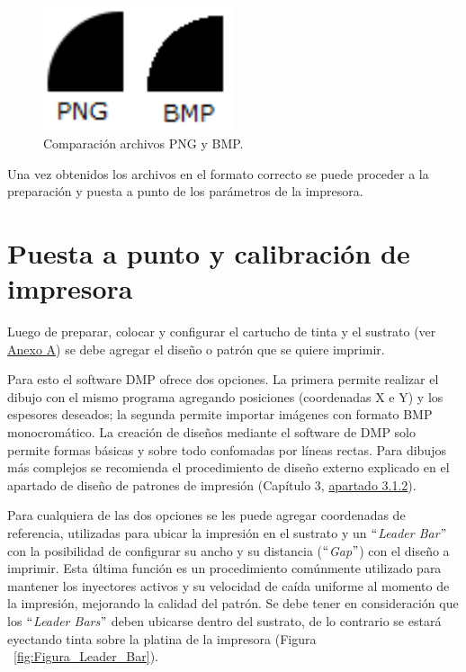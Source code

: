 \begin{figure}[H]
  \centering
    \includegraphics[width=0.5\textwidth]{Figuras/Figura_comparacion_png_bmp}
  \caption{Comparación archivos PNG y BMP.}
  \label{fig:Figura_comparacion_png_bmp}
\end{figure}

Una vez obtenidos los archivos en el formato correcto se puede proceder a la preparación y puesta a punto de los parámetros de la impresora.


\section{Puesta a punto y calibraci\'on de impresora}\label{sec:calib_impresora}
Luego de preparar, colocar y configurar el cartucho de tinta y el sustrato (ver \hyperref[chap:apendiceA]{Anexo A}) se debe agregar el diseño o patrón que se quiere imprimir.

Para esto el software DMP ofrece dos opciones. La primera permite realizar el dibujo con el mismo programa agregando posiciones (coordenadas X e Y) y los espesores deseados; la segunda permite importar imágenes con formato BMP monocromático. La creación de diseños mediante el software de DMP solo permite formas básicas y sobre todo confomadas por líneas rectas. Para dibujos más complejos se recomienda el procedimiento de diseño externo explicado en el apartado de diseño de patrones de impresión (Capítulo 3, \hyperref[subsec:diseno_impresion]{apartado 3.1.2}).

Para cualquiera de las dos opciones se les puede agregar coordenadas de referencia, utilizadas para ubicar la impresión en el sustrato y un $``$\textit{Leader Bar}$"$ con la posibilidad de configurar su ancho y su distancia ($``$\textit{Gap}$"$) con el diseño a imprimir. Esta última función es un procedimiento comúnmente utilizado para mantener los inyectores activos y su velocidad de caída uniforme al momento de la impresión, mejorando la calidad del patrón. Se debe tener en consideración que los $``$\textit{Leader Bars}$"$ deben ubicarse dentro del sustrato, de lo contrario se estará eyectando tinta sobre la platina de la impresora (Figura ~\ref{fig:Figura_Leader_Bar}).

